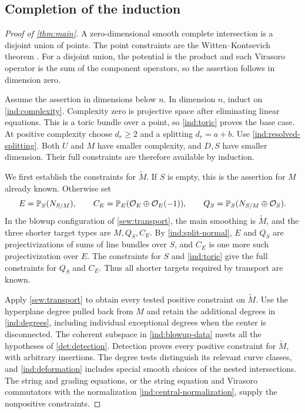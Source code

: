 \subsection{Completion of the induction}
\label{ind:complete}

\begin{proof}[Proof of \cref{thm:main}]
A zero-dimensional smooth complete intersection is a disjoint union
of points. The point constraints are the Witten--Kontsevich theorem
\cite{Witten1991,Kontsevich1992}. For a disjoint union, the potential
is the product and each Virasoro operator is the sum of the component
operators, so the assertion follows in dimension zero.

Assume the assertion in dimensions below $n$. In dimension $n$,
induct on \eqref{ind:complexity}. Complexity zero is projective space
after eliminating linear equations. This is a toric bundle over a
point, so \cref{ind:toric} proves the base case. At positive
complexity choose $d_r\ge2$ and a splitting $d_r=a+b$. Use
\eqref{ind:resolved-splitting}. Both $U$ and $M$ have smaller
complexity, and $D,S$ have smaller dimension. Their full constraints
are therefore available by induction.

We first establish the constraints for $\widetilde M$. If $S$ is
empty, this is the assertion for $M$ already known. Otherwise set
\[
 E=\mathbb P_S(N_{S/M}),\qquad
 C_E=\mathbb P_E(\mathcal O_E\oplus\mathcal O_E(-1)),\qquad
 Q_S=\mathbb P_S(N_{S/M}\oplus\mathcal O_S).
\]
In the blowup configuration of \cref{sew:transport}, the main
smoothing is $\widetilde M$, and the three shorter target types are
$M,Q_S,C_E$. By \eqref{ind:split-normal}, $E$ and $Q_S$ are
projectivizations of sums of line bundles over $S$, and $C_E$ is one
more such projectivization over $E$. The constraints for $S$ and
\cref{ind:toric} give the full constraints for $Q_S$ and $C_E$.
Thus all shorter targets required by transport are known.

Apply \cref{sew:transport} to obtain every tested positive constraint
on $\widetilde M$. Use the hyperplane degree pulled back from $M$
and retain the additional degrees in \cref{ind:degrees}, including
individual exceptional degrees when the center is disconnected.
The coherent subspace in \cref{ind:blowup-data} meets all the
hypotheses of \cref{det:detection}. Detection proves every positive
constraint for $\widetilde M$, with arbitrary insertions. The degree
tests distinguish its relevant curve classes, and
\cref{ind:deformation} includes special smooth choices of the nested
intersections. The string and grading equations, or the string
equation and Virasoro commutators with the normalization
\eqref{ind:central-normalization}, supply the nonpositive constraints.


\end{proof}
